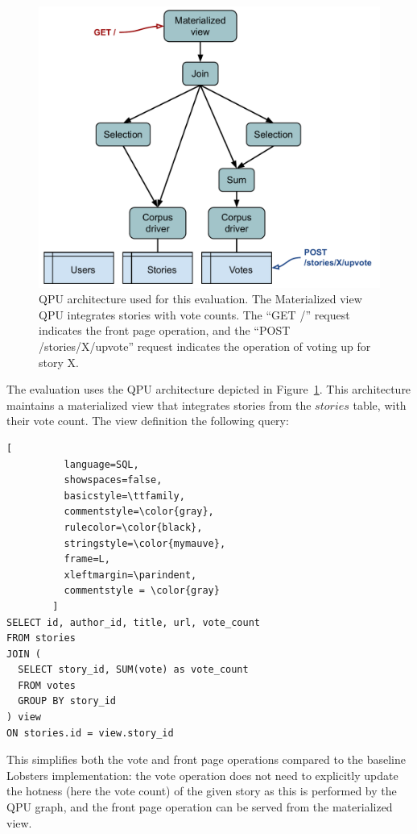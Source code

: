 \begin{figure}[H]
  \centering
    \includegraphics[scale=0.5]{./figures/evaluation/lobsters_architecture_eval.pdf}
  \caption{QPU architecture used for this evaluation. The Materialized view QPU integrates stories with vote counts.
  The ``GET /'' request indicates the front page operation, and the ``POST /stories/X/upvote'' request indicates the operation of voting up for story X.}
  \label{fig:eval_lobsters_qpu_arch}
\end{figure}

\bigskip
\noindent
The evaluation uses the QPU architecture depicted in Figure~\ref{fig:eval_lobsters_qpu_arch}.
This architecture maintains a materialized view that integrates stories from the $stories$ table,
with their vote count.
The view definition the following query:

\begin{lstlisting}[
          language=SQL,
          showspaces=false,
          basicstyle=\ttfamily,
          commentstyle=\color{gray},
          rulecolor=\color{black},
          stringstyle=\color{mymauve},
          frame=L,
          xleftmargin=\parindent,
          commentstyle = \color{gray}
        ]
SELECT id, author_id, title, url, vote_count
FROM stories
JOIN (
  SELECT story_id, SUM(vote) as vote_count
  FROM votes
  GROUP BY story_id
) view
ON stories.id = view.story_id
\end{lstlisting}

This simplifies both the vote and front page operations compared to the baseline Lobsters implementation:
the vote operation does not need to explicitly update the hotness (here the vote count) of the given story as this
is performed by the QPU graph,
and the front page operation can be served from the materialized view.


